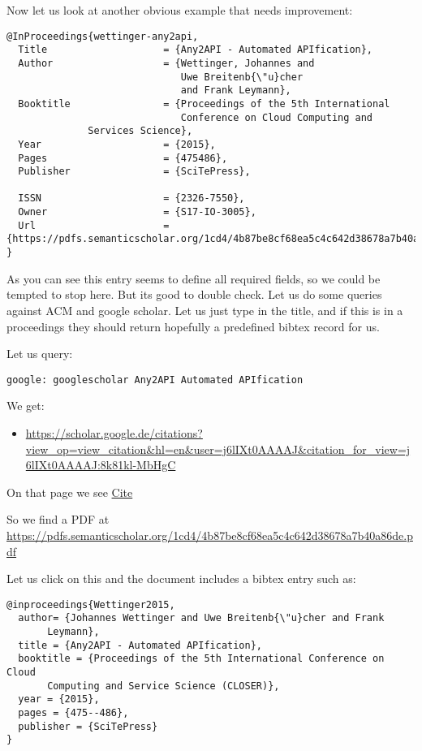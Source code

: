 Now let us look at another obvious example that needs improvement:

\begin{verbatim}
@InProceedings{wettinger-any2api,
  Title                    = {Any2API - Automated APIfication},
  Author                   = {Wettinger, Johannes and
                              Uwe Breitenb{\"u}cher
                              and Frank Leymann},
  Booktitle                = {Proceedings of the 5th International
                              Conference on Cloud Computing and
              Services Science},
  Year                     = {2015},
  Pages                    = {475­486},
  Publisher                = {SciTePress},

  ISSN                     = {2326-7550},
  Owner                    = {S17-IO-3005},
  Url                      = {https://pdfs.semanticscholar.org/1cd4/4b87be8cf68ea5c4c642d38678a7b40a86de.pdf}
}
\end{verbatim}

As you can see this entry seems to define all required fields, so we
could be tempted to stop here. But its good to double check. Let us do
some queries against ACM and google scholar. Let us just type in the
title, and if this is in a proceedings they should return hopefully a
predefined bibtex record for us.

Let us query:

\begin{verbatim}
google: googlescholar Any2API Automated APIfication
\end{verbatim}

We get:

\begin{itemize}

\item
  \url{https://scholar.google.de/citations?view_op=view_citation\&hl=en\&user=j6lIXt0AAAAJ\&citation_for_view=j6lIXt0AAAAJ:8k81kl-MbHgC}
\end{itemize}

On that page we see
\href{https://scholar.google.com/scholar_lookup?title=Automated+drug+dispensing+system+reduces+medication+errors+in+an+intensive+care+setting\&author=Chapuis\&publication_year=2010\#}{Cite}

So we find a PDF at
\url{https://pdfs.semanticscholar.org/1cd4/4b87be8cf68ea5c4c642d38678a7b40a86de.pdf}

Let us click on this and the document includes a bibtex entry such as:

\begin{verbatim}
@inproceedings{Wettinger2015, 
  author= {Johannes Wettinger and Uwe Breitenb{\"u}cher and Frank
       Leymann},
  title = {Any2API - Automated APIfication},
  booktitle = {Proceedings of the 5th International Conference on Cloud
       Computing and Service Science (CLOSER)},
  year = {2015},
  pages = {475--486},
  publisher = {SciTePress}
} 
\end{verbatim}


